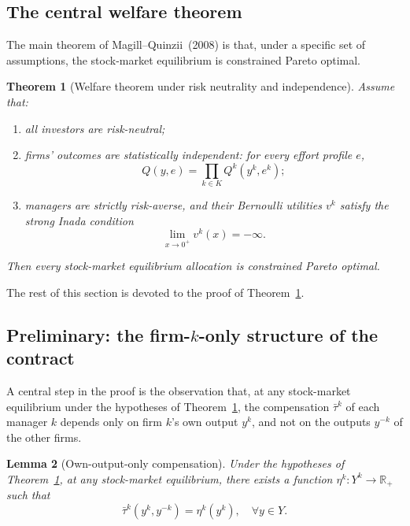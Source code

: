 \documentclass[11pt,a4paper,oneside]{book}
\def\R{\mathbb{R}}
\theoremstyle{plain}
\newtheorem{theorem}{Theorem}[chapter]
\newtheorem{lemma}[theorem]{Lemma}
\theoremstyle{definition}
\theoremstyle{remark}
\numberwithin{equation}{chapter}
\begin{document}
\subsection{The central welfare theorem}

The main theorem of Magill--Quinzii~(2008) is that, under a specific set of assumptions, the stock-market equilibrium is constrained Pareto optimal.

\begin{theorem}[Welfare theorem under risk neutrality and independence]\label{thm:MQ08-welfare}
Assume that:
\begin{enumerate}
  \item[\textup{(a)}] \emph{all} investors are risk-neutral;
  \item[\textup{(b)}] firms' outcomes are statistically independent: for every effort profile $e$,
  \begin{equation}\label{eq:independence-MQ08}
    Q(y, e) = \prod_{k \in K} Q^k(y^k, e^k);
  \end{equation}
  \item[\textup{(c)}] managers are strictly risk-averse, and their Bernoulli utilities $v^k$ satisfy the strong Inada condition
  \begin{equation*}
    \lim_{x \to 0^+} v^k(x) = -\infty.
  \end{equation*}
\end{enumerate}
Then every stock-market equilibrium allocation is constrained Pareto optimal.
\end{theorem}

The rest of this section is devoted to the proof of Theorem~\ref{thm:MQ08-welfare}.

\subsection{Preliminary: the firm-$k$-only structure of the contract}

A central step in the proof is the observation that, at any stock-market equilibrium under the hypotheses of Theorem~\ref{thm:MQ08-welfare}, the compensation $\bar{\tau}^k$ of each manager $k$ depends only on firm $k$'s own output $y^k$, and not on the outputs $y^{-k}$ of the other firms.

\begin{lemma}[Own-output-only compensation]\label{lem:own-output}
Under the hypotheses of Theorem~\ref{thm:MQ08-welfare}, at any stock-market equilibrium, there exists a function $\eta^k : Y^k \to \R_+$ such that
\begin{equation*}
  \bar{\tau}^k(y^k, y^{-k}) = \eta^k(y^k),
  \quad \forall y \in Y.
\end{equation*}
\end{lemma}
\end{document}
